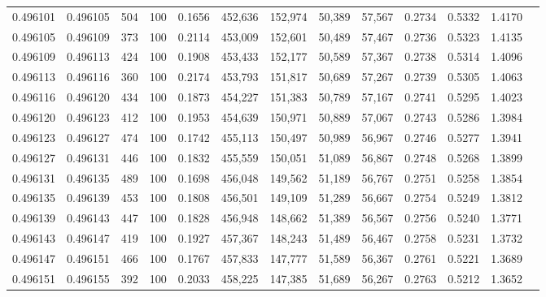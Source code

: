 \begin{tabular}{rrrrrrrrrrrrr}
0.496101 & 0.496105 &   504 & 100 &                                     0.1656 & 452,636 & 152,974 &  50,389 &  57,567 & 0.2734 & 0.5332 & 1.4170 \\
0.496105 & 0.496109 &   373 & 100 &                                     0.2114 & 453,009 & 152,601 &  50,489 &  57,467 & 0.2736 & 0.5323 & 1.4135 \\
0.496109 & 0.496113 &   424 & 100 &                                     0.1908 & 453,433 & 152,177 &  50,589 &  57,367 & 0.2738 & 0.5314 & 1.4096 \\
0.496113 & 0.496116 &   360 & 100 &                                     0.2174 & 453,793 & 151,817 &  50,689 &  57,267 & 0.2739 & 0.5305 & 1.4063 \\
0.496116 & 0.496120 &   434 & 100 &                                     0.1873 & 454,227 & 151,383 &  50,789 &  57,167 & 0.2741 & 0.5295 & 1.4023 \\
0.496120 & 0.496123 &   412 & 100 &                                     0.1953 & 454,639 & 150,971 &  50,889 &  57,067 & 0.2743 & 0.5286 & 1.3984 \\
0.496123 & 0.496127 &   474 & 100 &                                     0.1742 & 455,113 & 150,497 &  50,989 &  56,967 & 0.2746 & 0.5277 & 1.3941 \\
0.496127 & 0.496131 &   446 & 100 &                                     0.1832 & 455,559 & 150,051 &  51,089 &  56,867 & 0.2748 & 0.5268 & 1.3899 \\
0.496131 & 0.496135 &   489 & 100 &                                     0.1698 & 456,048 & 149,562 &  51,189 &  56,767 & 0.2751 & 0.5258 & 1.3854 \\
0.496135 & 0.496139 &   453 & 100 &                                     0.1808 & 456,501 & 149,109 &  51,289 &  56,667 & 0.2754 & 0.5249 & 1.3812 \\
0.496139 & 0.496143 &   447 & 100 &                                     0.1828 & 456,948 & 148,662 &  51,389 &  56,567 & 0.2756 & 0.5240 & 1.3771 \\
0.496143 & 0.496147 &   419 & 100 &                                     0.1927 & 457,367 & 148,243 &  51,489 &  56,467 & 0.2758 & 0.5231 & 1.3732 \\
0.496147 & 0.496151 &   466 & 100 &                                     0.1767 & 457,833 & 147,777 &  51,589 &  56,367 & 0.2761 & 0.5221 & 1.3689 \\
0.496151 & 0.496155 &   392 & 100 &                                     0.2033 & 458,225 & 147,385 &  51,689 &  56,267 & 0.2763 & 0.5212 & 1.3652 \\

\end{tabular}
